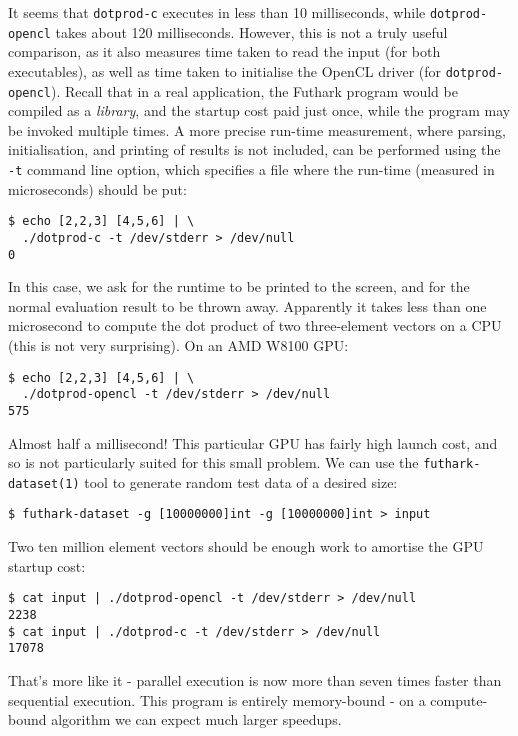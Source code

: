 \documentclass[oneside,11pt]{book}
\begin{document}
It seems that \texttt{dotprod-c} executes in less than 10
milliseconds, while \texttt{dotprod-opencl} takes about 120
milliseconds.  However, this is not a truly useful comparison, as it
also measures time taken to read the input (for both executables), as
well as time taken to initialise the OpenCL driver (for
\texttt{dotprod-opencl}).  Recall that in a real application, the
Futhark program would be compiled as a \textit{library}, and the
startup cost paid just once, while the program may be invoked multiple
times.  A more precise run-time measurement, where parsing,
initialisation, and printing of results is not included, can be
performed using the \texttt{-t} command line option, which specifies a
file where the run-time (measured in microseconds) should be put:

\begin{verbatim}
$ echo [2,2,3] [4,5,6] | \
  ./dotprod-c -t /dev/stderr > /dev/null
0
\end{verbatim}

In this case, we ask for the runtime to be printed to the screen, and
for the normal evaluation result to be thrown away.  Apparently it
takes less than one microsecond to compute the dot product of two
three-element vectors on a CPU (this is not very surprising).  On an
AMD W8100 GPU:

\begin{verbatim}
$ echo [2,2,3] [4,5,6] | \
  ./dotprod-opencl -t /dev/stderr > /dev/null
575
\end{verbatim}

Almost half a millisecond!  This particular GPU has fairly high launch
cost, and so is not particularly suited for this small problem.  We
can use the \texttt{futhark-dataset(1)} tool to generate random test
data of a desired size:

\begin{verbatim}
$ futhark-dataset -g [10000000]int -g [10000000]int > input
\end{verbatim}

Two ten million element vectors should be enough work to amortise the
GPU startup cost:

\begin{verbatim}
$ cat input | ./dotprod-opencl -t /dev/stderr > /dev/null
2238
$ cat input | ./dotprod-c -t /dev/stderr > /dev/null
17078
\end{verbatim}

That's more like it - parallel execution is now more than seven times
faster than sequential execution.  This program is entirely
memory-bound - on a compute-bound algorithm we can expect much larger
speedups.
\end{document}
